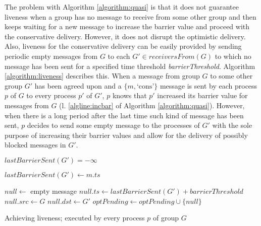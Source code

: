 \documentclass[times, 10pt]{article}
\begin{document}
The problem with Algorithm \ref{algorithm:quasi} is that it does not guarantee liveness when a group has no message to receive from some other group and then keeps waiting for a new message to increase the barrier value and proceed with the conservative delivery. However, it does not disrupt the optimistic delivery. Also, liveness for the conservative delivery can be easily provided by sending periodic empty messages from $G$ to each $G' \in receiversFrom(G)$ to which no message has been sent for a specified time threshold \textit{barrierThreshold}. Algorithm \ref{algorithm:liveness} describes this. When a message from group $G$ to some other group $G'$ has been agreed upon and a $\{m, \text{`cons'}\}$ message is sent by each process $p$ of $G$ to every process $p'$ of $G'$, $p$ knows that $p'$ increased its barrier value for messages from $G$ (l. \ref{algline:incbar} of Algorithm \ref{algorithm:quasi}). However, when there is a long period after the last time such kind of message has been sent, $p$ decides to send some empty message to the processes of $G'$ with the sole purpose of increasing their barrier values and allow for the delivery of possibly blocked messages in $G'$.

\begin{algorithm}
\begin{distribalgo}[1]
\blankline
{}
    \STATE $lastBarrierSent(G') = -\infty$
  \ENDINDENT
\ENDINDENT

\blankline
{}
  \STATE $lastBarrierSent(G') \leftarrow m.ts$
\ENDINDENT

\blankline
{}
  \STATE $null \leftarrow$ empty message
  \STATE $null.ts \leftarrow lastBarrierSent(G') + barrierThreshold$ \label{algline:samenullid}
  \STATE $null.src \leftarrow G$
  \STATE $null.dst \leftarrow G'$ 
  \STATE $optPending \leftarrow optPending \cup \{null\}$
\ENDINDENT 

\blankline
\caption{Achieving liveness; executed by every process $p$ of group $G$}
\label{algorithm:liveness}
\end{distribalgo}
\end{algorithm}
\end{document}
